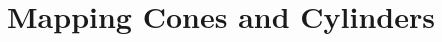 \documentclass{ximera}
\title{Mapping Cones and Cylinders}
\begin{document}
\begin{abstract}

\end{abstract}
\maketitle

\end{document}
